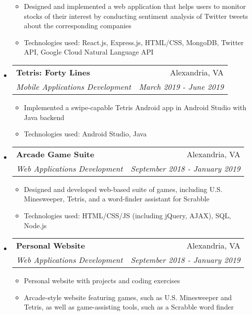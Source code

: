 \documentclass[letterpaper,11pt]{article}
\makeatletter
\newcommand{\resitem}[1]{\item #1 \vspace{-2pt}}
\newcommand{\ressubheading}[4]{
\begin{tabular*}{7.0in}{l@{\extracolsep{\fill}}r}
		\textbf{#1} & #2 \\
		\textit{#3} & \textit{#4} \\
\end{tabular*}\vspace{-6pt}}
\makeatother
\begin{document}
\begin{itemize}
    \begin{itemize}
        \item Designed and implemented a web application that helps users to monitor stocks of their interest by conducting sentiment analysis of Twitter tweets about the corresponding companies
        \item Technologies used: React.js, Express.js, HTML/CSS, MongoDB,  Twitter API, Google Cloud Natural Language API
    \end{itemize}
\item
    \ressubheading{Tetris: Forty Lines}{Alexandria, VA}{Mobile Applications Development}{March 2019 - June 2019}
	\begin{itemize}
		\resitem{Implemented a swipe-capable Tetris Android app in Android Studio with Java backend}
		\resitem{Technologies used: Android Studio, Java}
	\end{itemize}
\item
    \ressubheading{Arcade Game Suite}{Alexandria, VA}{Web Applications Development}{September 2018 - January 2019}
	\begin{itemize}
		\resitem{Designed and developed web-based suite of games, including U.S. Minesweeper, Tetris, and a word-finder assistant for Scrabble}
		\resitem{Technologies used: HTML/CSS/JS (including jQuery, AJAX), SQL, Node.js}
	\end{itemize}
\item
    \ressubheading{Personal Website}{Alexandria, VA}{Web Applications Development}{September 2018 - January 2019}
	\begin{itemize}
		\resitem{Personal website with projects and coding exercises}
		\resitem{Arcade-style website featuring games, such as U.S. Minesweeper and Tetris, as well as game-assisting tools, such as a Scrabble word finder}

\end{itemize}
\end{itemize}
\end{document}
